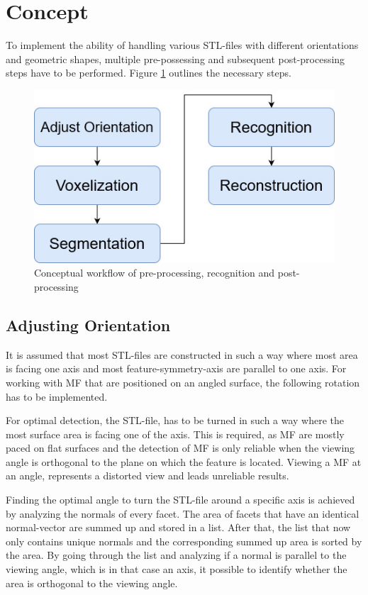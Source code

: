 \documentclass[conference]{IEEEtran}
\begin{document}
\section{Concept}
To implement the ability of handling various STL-files with different orientations and geometric shapes, multiple pre-possessing and subsequent post-processing steps have to be performed. Figure \ref{fig:flow} outlines the necessary steps.
\begin{figure}
	\begin{center}
	\includegraphics[width=0.7\linewidth]{pictures/flow.jpg}
	\caption{Conceptual workflow of pre-processing, recognition and post-processing }
	\label{fig:flow}
	\end{center}
\end{figure}

\subsection{Adjusting Orientation}
It is assumed that most STL-files are constructed in such a way where most area is facing one axis and most feature-symmetry-axis are parallel to one axis. For working with MF that are positioned on an angled surface, the following rotation has to be implemented. 

For optimal detection, the STL-file, has to be turned in such a way where the most surface area is facing one of the axis. This is required, as MF are mostly paced on flat surfaces and the detection of MF is only reliable when the viewing angle is orthogonal to the plane on which the feature is located. Viewing a MF at an angle, represents a distorted view and leads unreliable results. 

Finding the optimal angle to turn the STL-file around a specific axis is achieved by analyzing the normals of every facet. The area of facets that have an identical normal-vector are summed up and stored in a list. After that, the list that now only contains unique normals and the corresponding summed up area is sorted by the area. By going through the list and analyzing if a normal is parallel to the viewing angle, which is in that case an axis, it possible to identify whether the area is orthogonal to the viewing angle.
\end{document}
